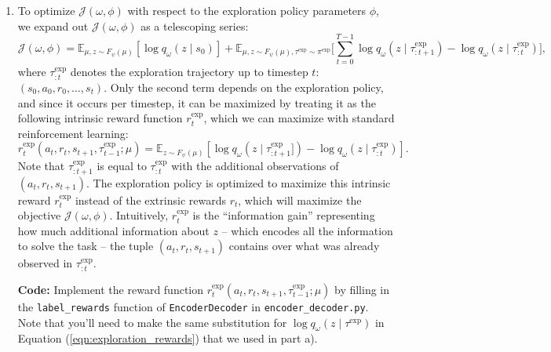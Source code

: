\documentclass[12pt]{article}
\begin{document}
\begin{enumerate}
    \item
        To optimize $\mathcal{J}(\omega, \phi)$ with respect to the exploration policy parameters $\phi$, we expand out $\mathcal{J}(\omega, \phi)$ as a telescoping series:
        \begin{equation*}
            \mathcal{J(\omega, \phi)} = \mathbb{E}_{\mu, z\sim F_{\psi}(\mu)}[\log q_{\omega}(z \mid s_0)] + \mathbb{E}_{\mu, z\sim F_{\psi}(\mu), \tau^\text{exp} \sim \pi^\text{exp}}\Big[\sum_{t=0}^{T - 1} \log q_{\omega}(z \mid \tau^\text{exp}_{:t + 1}) - \log q_{\omega}(z \mid \tau^\text{exp}_{:t})\Big],
        \end{equation*}
        where $\tau^\text{exp}_{:t}$ denotes the exploration trajectory up to timestep $t$: $(s_0, a_0, r_0, \ldots, s_t)$. Only the second term depends on the exploration policy, and since it occurs per timestep, it can be maximized by treating it as the following intrinsic reward function $r_t^\text{exp}$, which we can maximize with standard reinforcement learning:
        \begin{equation}\label{eqn:exploration_rewards}
            r_t^\text{exp}(a_t, r_t, s_{t+1}, \tau^\text{exp}_{t-1};\mu) = \mathbb{E}_{z\sim F_\psi(\mu)}\left[\log q_{\omega}(z \mid \tau^\text{exp}_{:t + 1}]) - \log q_{\omega}(z \mid \tau^\text{exp}_{:t})\right].
        \end{equation}
        Note that $\tau^\text{exp}_{:t + 1}$ is equal to $\tau^\text{exp}_{:t}$ with the additional observations of $(a_t, r_t, s_{t + 1})$.
        The exploration policy is optimized to maximize this intrinsic reward $r_t^\text{exp}$ instead of the extrinsic rewards $r_t$, which will maximize the objective $\mathcal{J}(\omega, \phi)$.
        Intuitively, $r_t^\text{exp}$ is the ``information gain'' representing how much additional information about $z$ -- which encodes all the information to solve the task -- the tuple $(a_t, r_t, s_{t + 1})$ contains over what was already observed in $\tau^\text{exp}_{:t}$.
        
        \textbf{Code: } Implement the reward function $r_t^\text{exp}(a_t, r_t, s_{t + 1}, \tau^\text{exp}_{t - 1}; \mu)$ by filling in the \texttt{label\_rewards} function of \texttt{EncoderDecoder} in \texttt{encoder\_decoder.py}.
        Note that you'll need to make the same substitution for $\log q_\omega(z \mid \tau^\text{exp})$ in Equation (\ref{eqn:exploration_rewards}) that we used in part a).
    

\end{enumerate}
\end{document}
